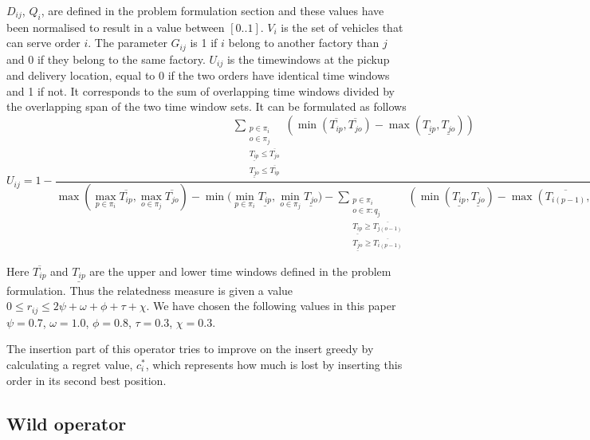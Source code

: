 \documentclass[../main.tex]{subfiles}
\begin{document}
$D_{ij}$, $Q_i$, are defined in the problem formulation section and these values have been normalised to result in a value between $[0..1]$. 
$V_i$ is the set of vehicles that can serve order $i$. 
The parameter $G_{ij}$ is 1 if $i$ belong to another factory than $j$ and 0 if they belong to the same factory. 
$U_{ij}$ is the timewindows at the pickup and delivery location, equal to 0 if the two orders have identical time windows and 1 if not. It corresponds to the sum of overlapping time windows divided by the overlapping span of the two time window sets.
It can be formulated as follows
\begin{equation}
    \label{overlaptime}
    U_{ij} = 1 - 
\dfrac{ 
    \sum\limits_{\substack{p\in \pi_i\\ o\in \pi_j\\ \underline{T_{ip}}\leq \overline{T_{jo}}\\ \underline{T_{jo}}\leq\overline{T_{ip}}}} 
    (\min(\overline{T_{ip}}, \overline{T_{jo}}) - \max(\underline{T_{ip}},\underline{T_{jo}}) )
    }
    {\max{(\max\limits_{p\in \pi_i} \overline{T_{ip}}, \max\limits_{o\in \pi_j} \overline{T_{jo}})} - 
    \min{(\min\limits_{p\in \pi_i} \underline{T_{ip}}, \min\limits_{o\in \pi_j} \underline{T_{jo}}}) -     
    \sum\limits_{\substack{p\in \pi_i\\ o\in \pi:q_j\\ \underline{T_{ip}}\geq \overline{T_{j(o-1)}}\\ \underline{T_{jo}}\geq\overline{T_{i(p-1)}}}} 
    (\min(\underline{T_{ip}}, \underline{T_{jo}}) - \max(\overline{T_{i(p-1)}},\overline{T_{j(o-1)}}) ) 
    }
\end{equation}

Here $\overline{T_{ip}}$ and $\underline{T_{ip}}$ are the upper and lower time windows defined in the problem formulation.
Thus the relatedness measure is given a value $0\leq r_{ij} \leq 2\psi + \omega + \phi + \tau  + \chi$. 
We have chosen the following values in this paper $\psi=0.7$, $\omega=1.0$, $\phi=0.8$, $\tau=0.3$, $\chi = 0.3$. \newline\par
The insertion part of this operator tries to improve on the insert greedy by calculating a regret value, $c^*_i$, which represents how much is lost by inserting this order in its second best position.

\subsection{Wild operator}
\end{document}

